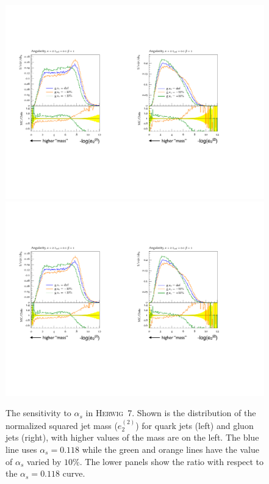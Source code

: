 \documentclass[11pt]{cernrep}
\begin{document}
\begin{figure}[t]
\begin{center}
\includegraphics[width = 0.49\columnwidth]{jetsub_alphas_sensitivity2a.pdf}\includegraphics[width = 0.48\columnwidth]{jetsub_alphas_sensitivity2b.pdf}
\end{center}
\caption{The sensitivity to $\alpha_s$ in \textsc{Herwig~7}.  Shown is the distribution of the normalized squared jet mass ($e_2^{(2)}$) for quark jets (left) and gluon jets (right), with higher values of the mass are on the left.  The blue line uses $\alpha_s=0.118$ while the green and orange lines have the value of $\alpha_s$ varied by $10\%$.  The lower panels show the ratio with respect to the $\alpha_s=0.118$ curve.}
\label{jetsub_alphas_fig:sensitivity}
\end{figure}
\end{document}
